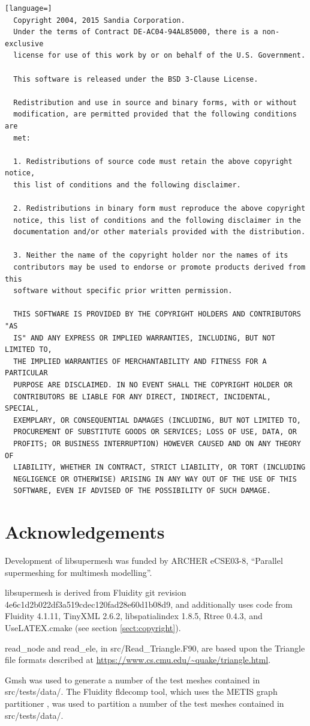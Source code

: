 \documentclass{article}
\begin{document}
\begin{lstlisting}[language=] 
  Copyright 2004, 2015 Sandia Corporation.
  Under the terms of Contract DE-AC04-94AL85000, there is a non-exclusive
  license for use of this work by or on behalf of the U.S. Government.
 
  This software is released under the BSD 3-Clause License.
 
  Redistribution and use in source and binary forms, with or without
  modification, are permitted provided that the following conditions are
  met:
 
  1. Redistributions of source code must retain the above copyright notice,
  this list of conditions and the following disclaimer.
 
  2. Redistributions in binary form must reproduce the above copyright
  notice, this list of conditions and the following disclaimer in the
  documentation and/or other materials provided with the distribution.
 
  3. Neither the name of the copyright holder nor the names of its
  contributors may be used to endorse or promote products derived from this
  software without specific prior written permission.
 
  THIS SOFTWARE IS PROVIDED BY THE COPYRIGHT HOLDERS AND CONTRIBUTORS "AS
  IS" AND ANY EXPRESS OR IMPLIED WARRANTIES, INCLUDING, BUT NOT LIMITED TO,
  THE IMPLIED WARRANTIES OF MERCHANTABILITY AND FITNESS FOR A PARTICULAR
  PURPOSE ARE DISCLAIMED. IN NO EVENT SHALL THE COPYRIGHT HOLDER OR
  CONTRIBUTORS BE LIABLE FOR ANY DIRECT, INDIRECT, INCIDENTAL, SPECIAL,
  EXEMPLARY, OR CONSEQUENTIAL DAMAGES (INCLUDING, BUT NOT LIMITED TO,
  PROCUREMENT OF SUBSTITUTE GOODS OR SERVICES; LOSS OF USE, DATA, OR
  PROFITS; OR BUSINESS INTERRUPTION) HOWEVER CAUSED AND ON ANY THEORY OF
  LIABILITY, WHETHER IN CONTRACT, STRICT LIABILITY, OR TORT (INCLUDING
  NEGLIGENCE OR OTHERWISE) ARISING IN ANY WAY OUT OF THE USE OF THIS
  SOFTWARE, EVEN IF ADVISED OF THE POSSIBILITY OF SUCH DAMAGE.
\end{lstlisting}

\section{Acknowledgements}

Development of libsupermesh was funded by ARCHER eCSE03-8, ``Parallel
supermeshing for multimesh modelling''.

libsupermesh is derived from Fluidity git revision
4e6c1d2b022df3a519cdec120fad28e60d1b08d9, and additionally uses code from
Fluidity 4.1.11, TinyXML 2.6.2, libspatialindex 1.8.5, Rtree 0.4.3, and
UseLATEX.cmake (see section \ref{sect:copyright}).

read\_node and read\_ele, in src/Read\_Triangle.F90, are based upon the
Triangle file formats described at
\url{https://www.cs.cmu.edu/~quake/triangle.html}.

Gmsh \citep{geuzaine2009} was used to generate a number of the test meshes
contained in src/tests/data/. The Fluidity fldecomp tool, which uses the METIS
graph partitioner \citep{karypis1998}, was used to partition a number of the
test meshes contained in src/tests/data/.



\end{document}
